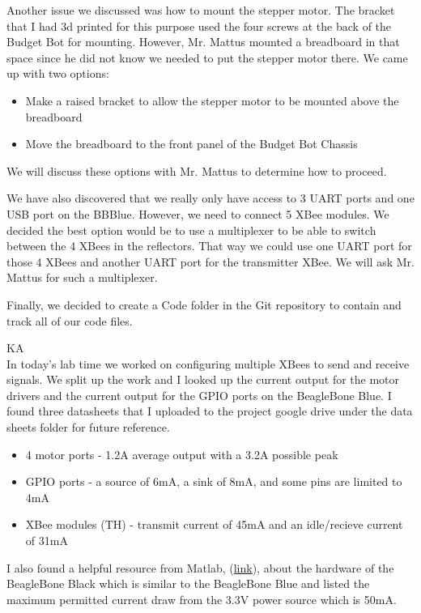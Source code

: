\documentclass[fontsize=11pt, %
                             paper=letter, %
                             openany, %
                             captions=tableheading,
                             index=totoc,
                             hyperref]{labbook}
\begin{document}
\begin{addmargin}[0cm]{0cm}
Another issue we discussed was how to mount the stepper motor. The bracket that I had 3d printed for this purpose used the four screws at the back of the Budget Bot for mounting. However, Mr. Mattus mounted a breadboard in that space since he did not know we needed to put the stepper motor there. We came up with two options:
\begin{itemize}
    \item Make a raised bracket to allow the stepper motor to be mounted above the breadboard
    \item Move the breadboard to the front panel of the Budget Bot Chassis
\end{itemize}
We will discuss these options with Mr. Mattus to determine how to proceed.\vspace{12pt}

We have also discovered that we really only have access to 3 UART ports and one USB port on the BBBlue. However, we need to connect 5 XBee modules. We decided the best option would be to use a multiplexer to be able to switch between the 4 XBees in the reflectors. That way we could use one UART port for those 4 XBees and another UART port for the transmitter XBee. We will ask Mr. Mattus for such a multiplexer.\vspace{12pt}

Finally, we decided to create a Code folder in the Git repository to contain and track all of our code files.

KA\\
In today's lab time we worked on configuring multiple XBees to send and receive signals. We split up the work and I looked up the current output for the motor drivers and the current output for the GPIO ports on the BeagleBone Blue. I found three datasheets that I uploaded to the project google drive under the data sheets folder for future reference.

\begin{itemize}
    \item 4 motor ports - 1.2A average output with a 3.2A possible peak
    \item GPIO ports - a source of 6mA, a sink of 8mA, and some pins are limited to 4mA
    \item XBee modules (TH) - transmit current of 45mA and an idle/recieve current of 31mA
\end{itemize}

I also found a helpful resource from Matlab, (\href{https://www.mathworks.com/help/supportpkg/beagleboneio/examples/working-with-beaglebone-black-hardware.html}{link}), about the hardware of the BeagleBone Black which is similar to the BeagleBone Blue and listed the maximum permitted current draw from the 3.3V power source which is 50mA.\vspace{12pt}


\end{addmargin}
\end{document}
